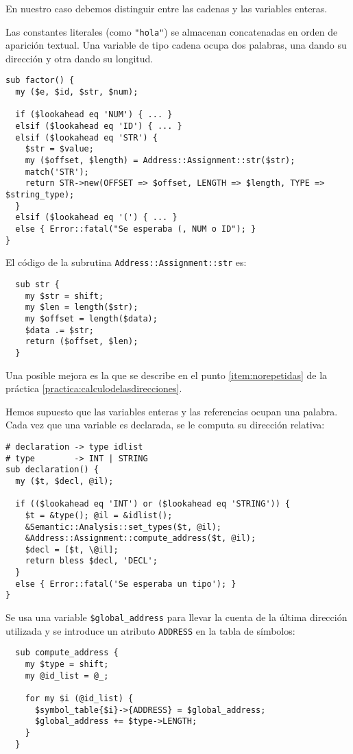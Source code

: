 En nuestro caso debemos distinguir entre las cadenas y las variables enteras.

Las constantes literales (como \verb|"hola"|) se almacenan 
concatenadas en orden de aparición textual.
Una variable de tipo cadena ocupa dos palabras, una dando su dirección 
y otra dando su longitud.

\begin{verbatim}
sub factor() {
  my ($e, $id, $str, $num);

  if ($lookahead eq 'NUM') { ... }
  elsif ($lookahead eq 'ID') { ... }
  elsif ($lookahead eq 'STR') {
    $str = $value;
    my ($offset, $length) = Address::Assignment::str($str);
    match('STR');
    return STR->new(OFFSET => $offset, LENGTH => $length, TYPE => $string_type);
  }
  elsif ($lookahead eq '(') { ... }
  else { Error::fatal("Se esperaba (, NUM o ID"); }
}
\end{verbatim}

El código de la subrutina \verb|Address::Assignment::str| es:
\begin{verbatim}
  sub str {
    my $str = shift;
    my $len = length($str);
    my $offset = length($data);
    $data .= $str;
    return ($offset, $len);
  }
\end{verbatim}
Una posible mejora es la que se describe en 
el punto
\ref{item:norepetidas}
de la práctica
\ref{practica:calculodelasdirecciones}.

Hemos supuesto que las variables enteras y las referencias ocupan una palabra.
Cada vez que una variable es declarada, se le computa su dirección relativa:

\begin{verbatim}
# declaration -> type idlist
# type        -> INT | STRING
sub declaration() {
  my ($t, $decl, @il);

  if (($lookahead eq 'INT') or ($lookahead eq 'STRING')) {
    $t = &type(); @il = &idlist();
    &Semantic::Analysis::set_types($t, @il);
    &Address::Assignment::compute_address($t, @il);
    $decl = [$t, \@il];
    return bless $decl, 'DECL';
  }
  else { Error::fatal('Se esperaba un tipo'); }
}
\end{verbatim}

Se usa una variable \verb|$global_address| para llevar la cuenta de la última 
dirección utilizada y se introduce un atributo \verb|ADDRESS| en 
la tabla de símbolos:

\begin{verbatim}
  sub compute_address {
    my $type = shift;
    my @id_list = @_;

    for my $i (@id_list) {
      $symbol_table{$i}->{ADDRESS} = $global_address;
      $global_address += $type->LENGTH;
    }
  }
\end{verbatim}

